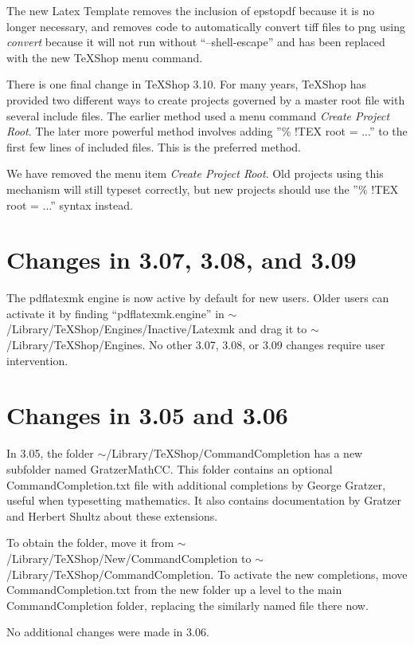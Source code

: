 \documentclass[11pt, oneside]{amsart}
\begin{document}
The new Latex Template removes the inclusion of epstopdf because it is no longer necessary, and removes  code to automatically convert tiff files to png using {\em convert} because it will not run without ``--shell-escape'' and has been replaced with the new TeXShop menu command.




There is one final change in TeXShop 3.10. For many years, TeXShop has provided two different ways to create projects governed by a master root file with several include files. The earlier method used a menu command {\em Create Project Root}. The later more powerful method involves adding ''\% !TEX root = ...'' to the
first few lines of included files. This is the preferred method.

We have  removed the menu item {\em Create Project Root}. Old projects using this mechanism will still typeset correctly, but new projects should use the  
''\% !TEX root = ...'' syntax instead.

\section{Changes in 3.07, 3.08, and 3.09}

The pdflatexmk engine is now active by default for new users. Older users can activate it by finding ``pdflatexmk.engine'' in $\sim$/Library/TeXShop/Engines/Inactive/Latexmk
and drag it to $\sim$/Library/TeXShop/Engines. No other 3.07, 3.08, or 3.09 changes require user intervention.

\section{Changes in 3.05 and 3.06}

In 3.05, the folder $\sim$/Library/TeXShop/CommandCompletion  has a new subfolder named GratzerMathCC. This folder contains
an optional CommandCompletion.txt file with additional completions by George Gratzer, useful when typesetting mathematics.
It also contains documentation by Gratzer and Herbert Shultz about these extensions.

To obtain the folder, move it from $\sim$/Library/TeXShop/New/CommandCompletion to $\sim$/Library/TeXShop/CommandCompletion.
To activate the new completions, move CommandCompletion.txt from the new folder up a level to the main CommandCompletion
folder, replacing the similarly named file there now.


No additional changes were made in 3.06.
\end{document}
